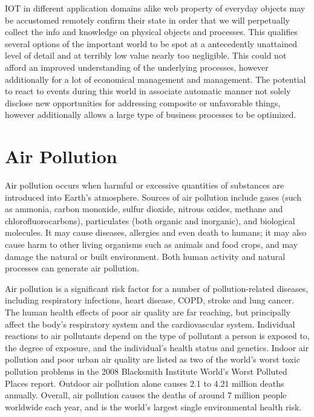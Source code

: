 IOT in different application domains alike web property of everyday objects may be accustomed remotely confirm their state in order that we will perpetually collect the info and knowledge on physical objects and processes. This qualifies several options of the
important world to be spot at a antecedently unattained level of detail and at terribly low value nearly too negligible. This could not afford an improved understanding of the underlying processes, however additionally for a lot of economical management and management. The potential to react to events during this world in associate automatic manner not solely disclose new opportunities for addressing composite or unfavorable
things, however additionally allows a large type of business processes to be optimized.

\section{Air Pollution}

Air pollution occurs when harmful or excessive quantities of substances are introduced into Earth's atmosphere. Sources of air pollution include gases (such as ammonia, carbon monoxide, sulfur dioxide, nitrous oxides, methane and chlorofluorocarbons), particulates (both organic and inorganic), and biological molecules. It may cause diseases, allergies and even death to humans; it may also cause harm to other living organisms such as animals and food crops, and may damage the natural or built environment. Both human activity and natural processes can generate air pollution.

Air pollution is a significant risk factor for a number of pollution-related diseases, including respiratory infections, heart disease, COPD, stroke and lung cancer. The human health effects of poor air quality are far reaching, but principally affect the body's respiratory system and the cardiovascular system. Individual reactions to air pollutants depend on the type of pollutant a person is exposed to, the degree of exposure, and the individual's health status and genetics. Indoor air pollution and poor urban air quality are listed as two of the world's worst toxic pollution problems in the 2008 Blacksmith Institute World's Worst Polluted Places report. Outdoor air pollution alone causes 2.1 to 4.21 million deaths annually. Overall, air pollution causes the deaths of around 7 million people worldwide each year, and is the world's largest single environmental health risk.



